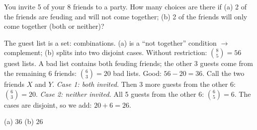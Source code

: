 
\begin{problem}
	You invite 5 of your 8 friends to a party. How many choices are there if
	(a) 2 of the friends are feuding and will not come together; (b) 2 of the
	friends will only come together (both or neither)?
\end{problem}

\begin{solution}
	\idea The guest list is a set: combinations. (a) is a ``not together''
	condition $\to$ complement; (b) splits into two disjoint cases.
	 Without restriction: $\binom85=56$ guest lists. A bad list
	contains both feuding friends; the other 3 guests come from the remaining
	6 friends: $\binom63=20$ bad lists. Good: $56-20=36$.
	 Call the two friends $X$ and $Y$. \emph{Case 1: both invited.}
	Then 3 more guests from the other 6: $\binom63=20$. \emph{Case 2: neither
		invited.} All 5 guests from the other 6: $\binom65=6$. The cases are
	disjoint, so we add: $20+6=26$.
	\begin{answer}
		(a) $36$ \qquad (b) $26$
	\end{answer}
\end{solution}
